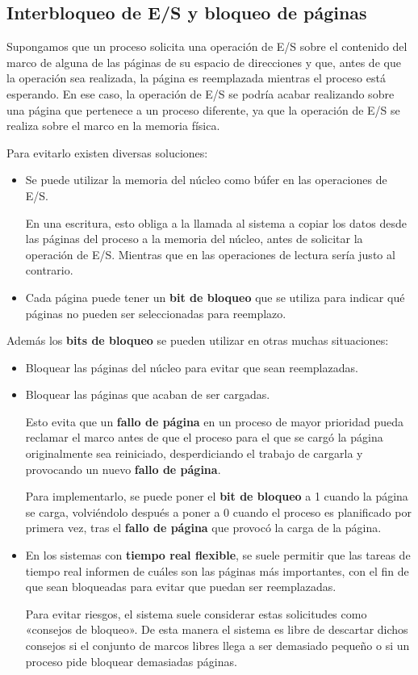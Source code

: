\subsection{Interbloqueo de E/S y bloqueo de
páginas}\label{_interbloqueo_de_es_y_bloqueo_de_puxe1ginas}

Supongamos que un proceso solicita una operación de E/S sobre el
contenido del marco de alguna de las páginas de su espacio de
direcciones y que, antes de que la operación sea realizada, la página es
reemplazada mientras el proceso está esperando. En ese caso, la
operación de E/S se podría acabar realizando sobre una página que
pertenece a un proceso diferente, ya que la operación de E/S se realiza
sobre el marco en la memoria física.

Para evitarlo existen diversas soluciones:

\begin{itemize}
\item
  Se puede utilizar la memoria del núcleo como búfer en las operaciones
  de E/S.

  En una escritura, esto obliga a la llamada al sistema a copiar los
  datos desde las páginas del proceso a la memoria del núcleo, antes de
  solicitar la operación de E/S. Mientras que en las operaciones de
  lectura sería justo al contrario.
\item
  Cada página puede tener un \textbf{bit de bloqueo} que se utiliza para
  indicar qué páginas no pueden ser seleccionadas para reemplazo.
\end{itemize}

Además los \textbf{bits de bloqueo}{} se pueden utilizar en otras muchas
situaciones:

\begin{itemize}
\item
  Bloquear las páginas del núcleo para evitar que sean reemplazadas.
\item
  Bloquear las páginas que acaban de ser cargadas.

  Esto evita que un \textbf{fallo de página} en un proceso de mayor
  prioridad pueda reclamar el marco antes de que el proceso para el que
  se cargó la página originalmente sea reiniciado, desperdiciando el
  trabajo de cargarla y provocando un nuevo \textbf{fallo de página}.

  Para implementarlo, se puede poner el \textbf{bit de bloqueo} a 1
  cuando la página se carga, volviéndolo después a poner a 0 cuando el
  proceso es planificado por primera vez, tras el \textbf{fallo de
  página} que provocó la carga de la página.
\item
  En los sistemas con \textbf{tiempo real flexible}, se suele permitir
  que las tareas de tiempo real informen de cuáles son las páginas más
  importantes, con el fin de que sean bloqueadas para evitar que puedan
  ser reemplazadas.

  Para evitar riesgos, el sistema suele considerar estas solicitudes
  como «consejos de bloqueo». De esta manera el sistema es libre de
  descartar dichos consejos si el conjunto de marcos libres llega a ser
  demasiado pequeño o si un proceso pide bloquear demasiadas páginas.
\end{itemize}

